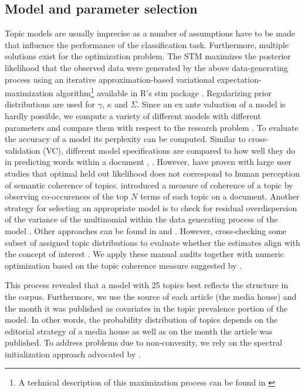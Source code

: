 \documentclass[12pt,a4paper,notitlepage]{article}
\begin{document}
\subsection{Model and parameter selection}

Topic models are usually imprecise as a number of assumptions have to be made that influence the performance of the classification task. Furthermore, multiple solutions exist for the optimization problem. The STM maximizes the posterior likelihood that the observed data were generated by the above data-generating process using an iterative approximation-based variational expectation-maximization algorithm\footnote{A technical description of this maximization process can be found in \citet{roberts_model_2016}} available in R's stm package \citep{roberts_stm:_2016}. Regularizing prior distributions are used for $\gamma$, $\kappa$ and $\Sigma$. Since an ex ante valuation of a model is hardly possible, we compute a variety of different models with different parameters and compare them with respect to the research problem \citep{gentzkow_text_2017}. To evaluate the accuracy of a model its perplexity can be computed. Similar to cross-validation (VC), different model specifications are compared to how well they do in predicting words within a document \citep{asuncion_smoothing_2012}, \citep{wallach_evaluation_2009}. However, \citet{chang_reading_2009} have proven with large user studies that optimal held out likelihood does not correspond to human perception of semantic coherence of topics. \cite{mimno_optimizing_2011} introduced a measure of coherence of a topic by observing co-occurences of the top $N$ terms of each topic on a document. Another strategy for selecting an appropriate model is to check for residual overdispersion of the variance of the multinomial within the data generating process of the model \citep{taddy_estimation_2012}. Other approaches can be found in \citet{airoldi_reconceptualizing_2010} and \citet{teh_hierarchical_2006}. However, cross-checking some subset of assigned topic distributions to evaluate whether the estimates align with the concept of interest \citep{gentzkow_text_2017}. We apply these manual audits together with numeric optimization based on the topic coherence measure suggested by \citet{mimno_optimizing_2011}. 

This process revealed that a model with 25 topics best reflects the structure in the corpus. Furthermore, we use the source of each article (the media house) and the month it was published as covariates in the topic prevalence portion of the model. In other words, the probability distribution of topics depends on the editorial strategy of a media house as well as on the month the article was published. To address problems due to non-convexity, we rely on the spectral initialization approach advocated by \citet{roberts_navigating_2016}. 
\end{document}
